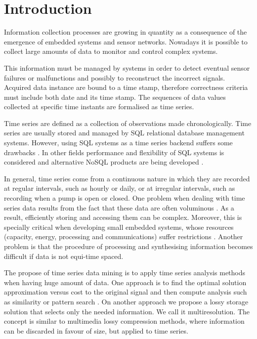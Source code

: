 


\section{Introduction}

Information collection processes are growing in quantity as a
consequence of the emergence of embedded systems and sensor networks.
Nowadays it is possible to collect large amounts of data to
monitor and control complex systems.

This information must be managed by systems in order to detect
eventual sensor failures or malfunctions and possibly to reconstruct
the incorrect signals. Acquired data instance are bound to a time
stamp, therefore correctness criteria must include both date and its
time stamp. The sequences of data values collected at specific time
instants are formalised as time series.

Time series are defined as a collection of observations made
chronologically. Time series are usually stored and managed by SQL
relational database management systems. However, using SQL systems as
a time series backend suffers some drawbacks
\cite{dreyer94,schmidt95,stonebraker09:scidb,zhang11}.  In other
fields performance and flexibility of SQL systems is considered and
alternative NoSQL products are being developed
\cite{atzeni13:relational_model_dead,stonebraker10}.

In general, time series come from a continuous nature in which they
are recorded at regular intervals, such as hourly or daily, or at
irregular intervals, such as recording when a pump is open or closed.
One problem when dealing with time series data results from the fact
that these data are often voluminous \cite{fu11,keogh08:isax}. As a
result, efficiently storing and accessing them can be complex. Moreover, this is
specially critical when developing small embedded systems, whose
resources (capacity, energy, processing and communications) suffer
restrictions \cite{yaogehrke02}.  Another problem is that the
procedure of processing and synthesising information becomes
difficult if data is not equi-time spaced.

The propose of time series data mining is to apply time series
analysis methods when having huge amount of data.  One approach is to
find the optimal solution approximation versus cost to the original signal
and then compute analysis such as similarity or pattern search
\cite{fu11,keogh01,last01}. On another approach we propose a lossy storage
solution that selects only the needed information. We call it
multiresolution. The concept is similar to multimedia lossy
compression methods, where information can be discarded in favour of
size, but applied to time series.



